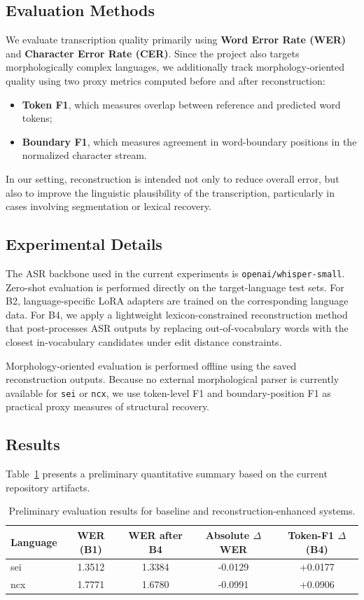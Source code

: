 \documentclass[11pt]{article}
\begin{document}
\subsection{Evaluation Methods}
We evaluate transcription quality primarily using \textbf{Word Error Rate (WER)} and \textbf{Character Error Rate (CER)}. Since the project also targets morphologically complex languages, we additionally track morphology-oriented quality using two proxy metrics computed before and after reconstruction:
\begin{itemize}
    \item \textbf{Token F1}, which measures overlap between reference and predicted word tokens;
    \item \textbf{Boundary F1}, which measures agreement in word-boundary positions in the normalized character stream.
\end{itemize}

In our setting, reconstruction is intended not only to reduce overall error, but also to improve the linguistic plausibility of the transcription, particularly in cases involving segmentation or lexical recovery.

\subsection{Experimental Details}
The ASR backbone used in the current experiments is \texttt{openai/whisper-small}. Zero-shot evaluation is performed directly on the target-language test sets. For B2, language-specific LoRA adapters are trained on the corresponding language data. For B4, we apply a lightweight lexicon-constrained reconstruction method that post-processes ASR outputs by replacing out-of-vocabulary words with the closest in-vocabulary candidates under edit distance constraints.

Morphology-oriented evaluation is performed offline using the saved reconstruction outputs. Because no external morphological parser is currently available for \texttt{sei} or \texttt{ncx}, we use token-level F1 and boundary-position F1 as practical proxy measures of structural recovery.


\subsection{Results}
Table~\ref{tab:midway-results} presents a preliminary quantitative summary based on the current repository artifacts.

\begin{table}[t]
\centering
\caption{Preliminary evaluation results for baseline and reconstruction-enhanced systems.}
\label{tab:midway-results}
\begin{tabular}{@{}lcccc@{}}
\toprule
\textbf{Language} & \textbf{WER (B1)} & \textbf{WER after B4} & \textbf{Absolute $\Delta$WER} & \textbf{Token-F1 $\Delta$ (B4)} \\
\midrule
sei & 1.3512 & 1.3384 & -0.0129 & +0.0177 \\
ncx & 1.7771 & 1.6780 & -0.0991 & +0.0906 \\
\bottomrule
\end{tabular}
\end{table}
\end{document}
